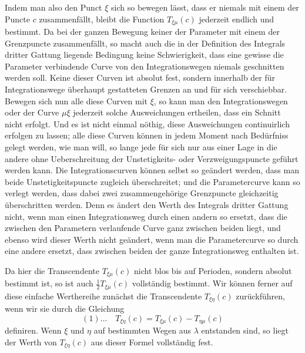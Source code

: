 \documentclass[10pt]{article}
\begin{document}
Indem man also den Punct \(\xi\) sich so bewegen lässt, dass er niemals mit einem der Puncte \(c\) zusammenfällt, bleibt die Function \(T_{\xi\mu}(c)\) jederzeit endlich und bestimmt. Da bei der ganzen Bewegung keiner der Parameter mit einem der Grenzpuncte zusammenfällt, so macht auch die in der Definition des Integrals dritter Gattung liegende Bedingung keine Schwierigkeit, dass eine gewisse die Parameter verbindende Curve von den Integrationswegen niemals geschnitten werden soll. Keine dieser Curven ist absolut fest, sondern innerhalb der für Integrationswege überhaupt gestatteten Grenzen an und für sich verschiebbar. Bewegen sich nun alle diese Curven mit \(\xi\), so kann man den Integrationswegen oder der Curve \(\mu\xi\) jederzeit solche Ausweichungen ertheilen, dass ein Schnitt nicht erfolgt. Und es ist nicht einmal nöthig, diese Ausweichungen continuirlich erfolgen zu lassen; alle diese Curven können in jedem Moment nach Bedürfniss gelegt werden, wie man will, so lange jede für sich nur aus einer Lage in die andere ohne Ueberschreitung der Unstetigkeits- oder Verzweigungspuncte geführt werden kann. Die Integrationscurven können selbst so geändert werden, dass man beide Unstetigkeitspuncte zugleich überschreitet; und die Parametercurve kann so verlegt werden, dass dabei zwei zusammengehörige Grenzpuncte gleichzeitig überschritten werden. Denn es ändert den Werth des Integrals dritter Gattung nicht, wenn man einen Integrationsweg durch einen andern so ersetzt, dass die zwischen den Parametern verlaufende Curve ganz zwischen beiden liegt, und ebenso wird dieser Werth nicht geändert, wenn man die Parametercurve so durch eine andere ersetzt, dass zwischen beiden der ganze Integrationsweg enthalten ist.

Da hier die Transcendente \(T_{\xi\mu}(c)\) nicht blos bis auf Perioden, sondern absolut bestimmt ist, so ist auch \(\frac12T_{\xi\mu}(c)\) vollständig bestimmt. Wir können ferner auf diese einfache Werthereihe zunächst die Transcendente \(T_{\xi\eta}(c)\) zurückführen, wenn wir sie durch die Gleichung
\[
(1)\ldots\quad T_{\xi\eta}(c)=T_{\xi\mu}(c)-T_{\eta\mu}(c)
\]
definiren. Wenn \(\xi\) und \(\eta\) auf bestimmten Wegen aus \(\lambda\) entstanden sind, so liegt der Werth von \(T_{\xi\eta}(c)\) aus dieser Formel vollständig fest.
\end{document}
